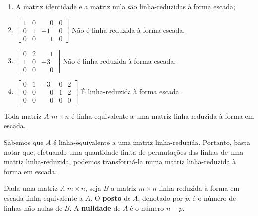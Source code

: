 \begin{exemplo}
\begin{enumerate}[label={\arabic*})]
	\item  A matriz identidade e a matriz nula s\~ao linha-reduzidas \`a forma escada;
	\item $\begin{bmatrix}
	1 & 0 & \phantom{-}0 & 0\\
	0 & 1 & -1 & 0\\
	0 & 0 & \phantom{-}1 & 0
	\end{bmatrix}$ N\~ao \'e linha-reduzida \`a forma escada.
	\item $\begin{bmatrix}
	0 & 2 & \phantom{-}1\\
	1 & 0 & -3\\
	0 & 0 & \phantom{-}0
	\end{bmatrix}$ N\~ao \'e linha-reduzida \`a forma escada.
	\item $\begin{bmatrix}
	0 & 1 & -3 & 0 & 2\\
	0 & 0 & \phantom{-}0 & 1 & 2\\
	0 & 0 & \phantom{-}0 & 0 & 0
	\end{bmatrix}$ \'E linha-reduzida \`a forma escada.
\end{enumerate}
\end{exemplo}

\begin{teorema}
Toda matriz $A$ $m \times n$ \'e linha-equivalente a uma matriz linha-reduzida \`a forma em escada.
\end{teorema}
\begin{prova}
Sabemos que $A$ \'e linha-equivalente a uma matriz linha-reduzida. Portanto, basta notar que, efetuando uma quantidade finita de permuta\c{c}\~oes das linhas de uma matriz linha-reduzida, podemos transform\'a-la numa matriz linha-reduzida \`a forma em escada.
\end{prova}

\begin{definicao}
Dada uma matriz $A$ $m \times n$, seja $B$ a matriz $m \times n$ linha-reduzida \`a forma em escada linha-equivalente a $A$. O \textbf{posto} de $A$, denotado por $p$, \'e o n\'umero de linhas n\~ao-nulas de $B$. A \textbf{nulidade} de $A$ \'e o n\'umero $n - p$.
\end{definicao}

